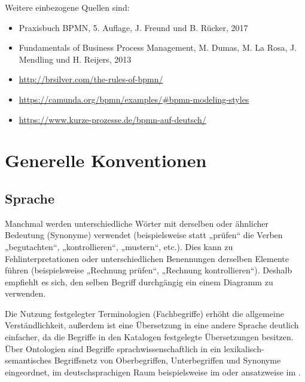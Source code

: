 \documentclass[12pt,report]{snetTeaching}
\begin{document}
Weitere einbezogene Quellen sind:
\begin{itemize}
\item Praxisbuch BPMN, 5. Auflage, J. Freund und B. Rücker, 2017
\item Fundamentals of Business Process Management, M. Dumas, M. La Rosa, J. Mendling und H. Reijers, 2013
\item \href{https://web.archive.org/web/20160426222746/http://brsilver.com:80/the-rules-of-bpmn/ }{http://brsilver.com/the-rules-of-bpmn/}
\item \url{https://camunda.org/bpmn/examples/#bpmn-modeling-styles}
\item \url{https://www.kurze-prozesse.de/bpmn-auf-deutsch/}
\end{itemize}





\chapter{Generelle Konventionen}


\section{Sprache}
Manchmal werden unterschiedliche Wörter mit derselben oder ähnlicher Bedeutung (Synonyme) verwendet (beispielsweise statt „prüfen“ die Verben „begutachten“, „kontrollieren“, „mustern“, etc.). Dies kann zu Fehlinterpretationen oder unterschiedlichen Benennungen derselben Elemente führen (beispielsweise „Rechnung prüfen“, „Rechnung kontrollieren“). Deshalb empfiehlt es sich, den selben Begriff durchgängig ein einem Diagramm zu verwenden.

Die Nutzung festgelegter Terminologien (Fachbegriffe) erhöht die allgemeine Verständlichkeit, außerdem ist eine Übersetzung in eine andere Sprache deutlich einfacher, da die Begriffe in den Katalogen festgelegte Übersetzungen besitzen. Über Ontologien sind Begriffe sprachwissenschaftlich in ein lexikalisch-semantisches Begriffsnetz von Oberbegriffen, Unterbegriffen und Synonyme eingeordnet, im deutschsprachigen Raum beispielsweise im  oder ansatzweise im .
\end{document}
